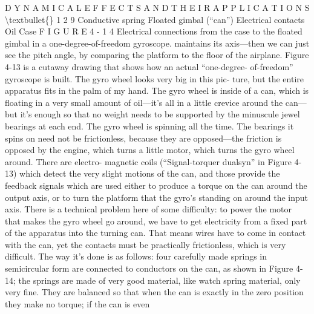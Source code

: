 \documentclass[10pt,oneside]{article}
\begin{document}
D Y N A M I C A L  E F F E C T S  A N D  T H E I R  A P P L I C A T I O N S \textbackslash{}textbullet\{\} 1 2 9 Conductive spring Floated gimbal (“can”) Electrical contacts Oil Case F I G U R E  4 - 1 4 Electrical connections from the case to the floated gimbal in a one-degree-of-freedom gyroscope. maintains its axis---then we can just see the pitch angle, by comparing the platform to the floor of the airplane. Figure 4-13 is a cutaway drawing that shows how an actual “one-degree- of-freedom” gyroscope is built. The gyro wheel looks very big in this pic- ture, but the entire apparatus fits in the palm of my hand. The gyro wheel is inside of a can, which is floating in a very small amount of oil---it’s all in a little crevice around the can---but it’s enough so that no weight needs to be supported by the minuscule jewel bearings at each end. The gyro wheel is spinning all the time. The bearings it spins on need not be frictionless, because they are opposed---the friction is opposed by the engine, which turns a little motor, which turns the gyro wheel around. There are electro- magnetic coils (“Signal-torquer dualsyn” in Figure 4-13) which detect the very slight motions of the can, and those provide the feedback signals which are used either to produce a torque on the can around the output axis, or to turn the platform that the gyro’s standing on around the input axis. There is a technical problem here of some difficulty: to power the motor that makes the gyro wheel go around, we have to get electricity from a fixed part of the apparatus into the turning can. That means wires have to come in contact with the can, yet the contacts must be practically frictionless, which is very difficult. The way it’s done is as follows: four carefully made springs in semicircular form are connected to conductors on the can, as shown in Figure 4-14; the springs are made of very good material, like watch spring material, only very fine. They are balanced so that when the can is exactly in the zero position they make no torque; if the can is even\par
\end{document}
